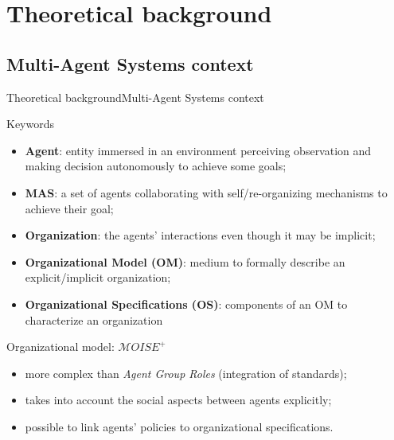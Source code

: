\AtBeginSection[]{
    \begin{frame}
        \frametitle{}
        \tableofcontents[currentsection]
    \end{frame}
}


\section{Theoretical background}

\subsection{Multi-Agent Systems context}

\begin{frame}[allowframebreaks]{Theoretical background}{Multi-Agent Systems context}

    \begin{block}{Keywords}
        \begin{itemize}
            \item \textbf{Agent}: entity immersed in an environment perceiving observation and making decision autonomously to achieve some goals;
            \item \textbf{MAS}: a set of agents collaborating with self/re-organizing mechanisms to achieve their goal;
            \item \textbf{Organization}: the agents' interactions even though it may be implicit;
            \item \textbf{Organizational Model (OM)}: medium to formally describe an explicit/implicit organization;
            \item \textbf{Organizational Specifications (OS)}: components of an OM to characterize an organization
        \end{itemize}
    \end{block}

    \begin{block}{Organizational model: $\mathcal{M}OISE^+$}
        \begin{itemize}
            \item more complex than \emph{Agent Group Roles} (integration of standards);
            \item takes into account the social aspects between agents explicitly;
            \item possible to link agents' policies to organizational specifications.
        \end{itemize}
    \end{block}

    

\end{frame}


